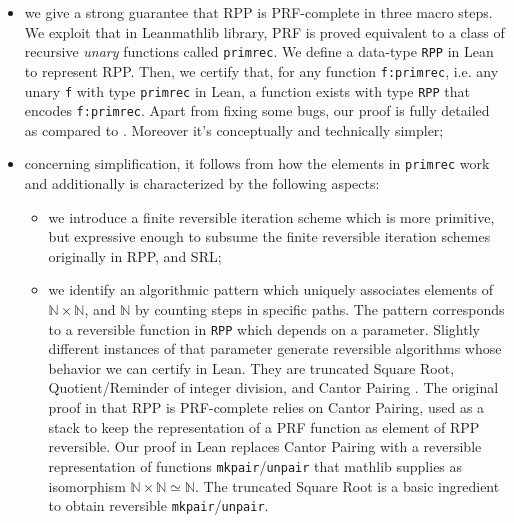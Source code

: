 \documentclass[runningheads]{llncs}
\newcommand{\RPP}{\textsf{RPP}\xspace}
\newcommand{\PRF}{\textsf{PRF}\xspace}
\newcommand{\MATHLIB}{\textsf{mathlib}\xspace}
\newcommand{\LEAN}{\textsf{Lean}\xspace}
\newcommand{\SRL}{\textsf{SRL}\xspace}
\begin{document}
\begin{itemize}
    \item we give a strong guarantee that \RPP is \PRF-complete in three macro steps. We exploit that in \LEAN \MATHLIB library, \PRF is proved equivalent to a class of recursive \emph{unary} functions called \lstinline|primrec|. We define a data-type \lstinline|RPP| in \LEAN to represent \RPP. Then, we certify that, for any function \lstinline|f:primrec|, i.e. any unary \lstinline|f| with type \lstinline|primrec| in \LEAN, a function exists with type \lstinline|RPP| that encodes \lstinline|f:primrec|. Apart from fixing some bugs, our proof is fully detailed as compared to \cite{DBLP:journals/tcs/PaoliniPR20}. Moreover it's conceptually and technically simpler;

    \item concerning simplification, it follows from how the elements in \lstinline|primrec| work and additionally is characterized by the following aspects:
    \begin{itemize}
        \item we introduce a finite reversible iteration scheme which is more primitive, but expressive enough to subsume the finite reversible iteration schemes originally in \RPP, and \SRL;

        \item we identify an algorithmic pattern which uniquely associates elements of
        $ \mathbb{N}\times\mathbb{N}$, and $ \mathbb{N}$ by counting steps in specific paths.
        The pattern corresponds to a reversible function in \lstinline|RPP| which depends on a parameter.
        Slightly different instances of that parameter generate reversible algorithms whose behavior we can certify in \LEAN. They are truncated Square Root, Quotient/Reminder of integer division, and Cantor Pairing \cite{Cantor1878,DBLP:journals/corr/Szudzik17}.
        The original proof in \cite{DBLP:journals/tcs/PaoliniPR20} that \RPP is \PRF-complete relies on Cantor Pairing, used as a stack to keep the representation of a \PRF function as element of \RPP reversible.
        Our proof in \LEAN replaces Cantor Pairing with a reversible representation of functions \lstinline|mkpair|/\lstinline|unpair| that \MATHLIB supplies as isomorphism $ \mathbb{N}\times\mathbb{N} \simeq \mathbb{N} $. The truncated Square Root is a basic ingredient to obtain reversible \lstinline|mkpair|/\lstinline|unpair|.
    \end{itemize}
\end{itemize}
\end{document}
